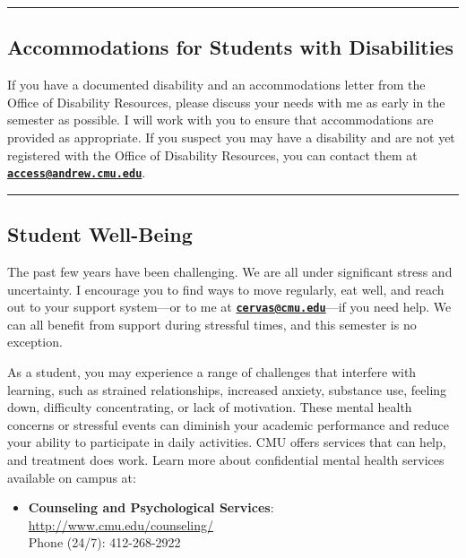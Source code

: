 \documentclass[]{tufte-handout}
\providecommand{\tightlist}{%
  \setlength{\itemsep}{0pt}\setlength{\parskip}{0pt}}
\begin{document}
\begin{center}\rule{0.5\linewidth}{0.5pt}\end{center}

\hypertarget{accommodations-for-students-with-disabilities}{%
\subsection{Accommodations for Students with
Disabilities}\label{accommodations-for-students-with-disabilities}}

If you have a documented disability and an accommodations letter from
the Office of Disability Resources, please discuss your needs with me as
early in the semester as possible. I will work with you to ensure that
accommodations are provided as appropriate. If you suspect you may have
a disability and are not yet registered with the Office of Disability
Resources, you can contact them at
\textbf{\href{mailto:access@andrew.cmu.edu}{\nolinkurl{access@andrew.cmu.edu}}}.

\begin{center}\rule{0.5\linewidth}{0.5pt}\end{center}

\hypertarget{student-well-being}{%
\subsection{Student Well-Being}\label{student-well-being}}

The past few years have been challenging. We are all under significant
stress and uncertainty. I encourage you to find ways to move regularly,
eat well, and reach out to your support system---or to me at
\textbf{\href{mailto:cervas@cmu.edu}{\nolinkurl{cervas@cmu.edu}}}---if
you need help. We can all benefit from support during stressful times,
and this semester is no exception.

As a student, you may experience a range of challenges that interfere
with learning, such as strained relationships, increased anxiety,
substance use, feeling down, difficulty concentrating, or lack of
motivation. These mental health concerns or stressful events can
diminish your academic performance and reduce your ability to
participate in daily activities. CMU offers services that can help, and
treatment does work. Learn more about confidential mental health
services available on campus at:

\begin{itemize}
\tightlist
\item
  \textbf{Counseling and Psychological Services}:
  \url{http://www.cmu.edu/counseling/}\\
  Phone (24/7): 412-268-2922
\end{itemize}
\end{document}
